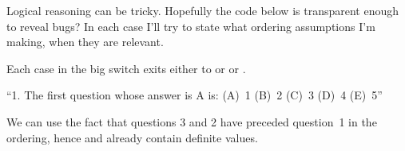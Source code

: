 Logical reasoning can be tricky. Hopefully the code below is transparent
enough to reveal bugs? In each case I'll try to state what ordering
assumptions I'm making, when they are relevant.

Each case in the big switch exits either to  or  or %
.

\fi

``1. The first question whose answer is A is: (A)~1 (B)~2 (C)~3 (D)~4
(E)~5''

We can use the fact that questions 3 and 2 have preceded question~1 in the
ordering, hence  and  already contain
definite values.

